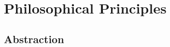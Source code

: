 \chapter{Philosophical Principles}

\section{Abstraction}


\begin{comment}

-Duality
-Bridges (between subfields) - everything hangs together, it's a network of knowledge
-Definitions, Theorems, Proofs, Conjectures, Experimental Evidence
-Formalism vs Intution
-Finitism, Constructivism
-Automation/mechanization of thought
-Precision, Non-Ambiguity
-Complexity from simplicity - deconstruction to simpler parts...there's a name for that
 emergence?

\end{comment}